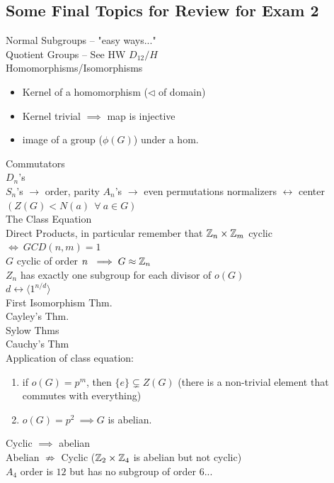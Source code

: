 \subsection*{Some Final Topics for Review for Exam 2}
Normal Subgroups -- "easy ways..." \\
Quotient Groups -- See HW $D_{12}/H$ \\
Homomorphisms/Isomorphisms
\begin{itemize}
    \item Kernel of a homomorphism ($\triangleleft$ of domain)
    \item Kernel trivial $\implies$ map is injective
    \item image of a group ($\phi(G)$) under a hom.
\end{itemize}
Commutators \\
$D_n$'s \\
$S_n$'s $\rightarrow$ order, parity
$A_n$'s $\rightarrow$ even permutations
normalizers $\leftrightarrow$ center $(Z(G)<N(a) \ \ \forall \ a \in G)$ \\
The Class Equation \\
Direct Products, in particular remember that ${\mathbb{ Z}}_{n}\times {\mathbb{ Z}}_{m}$ cyclic $\iff \ GCD(n,m)=1$ \\
$G$ cyclic of order $n \ \implies G\approx {\mathbb{ Z}}_n$ \\ 
$Z_n$ has exactly one subgroup for each divisor of $o(G)$ \\
$d \leftrightarrow \langle 1^{n/d}\rangle$ \\
First Isomorphism Thm. \\
Cayley's Thm. \\
Sylow Thms \\
Cauchy's Thm \\
Application of class equation:
\begin{enumerate}
    \item if $o(G)=p^m$, then $\{e\} \subsetneq Z(G)$ (there is a non-trivial element that commutes with everything)
    \item $o(G)=p^2 \ \implies G$ is abelian.
\end{enumerate}
Cyclic $\implies$ abelian\\
Abelian $\not \Rightarrow$ Cyclic  (${\mathbb{ Z}}_2\times {\mathbb{ Z}}_4$ is abelian but not cyclic)\\
$A_4$ order is $12$ but has no subgroup of order $6$...


